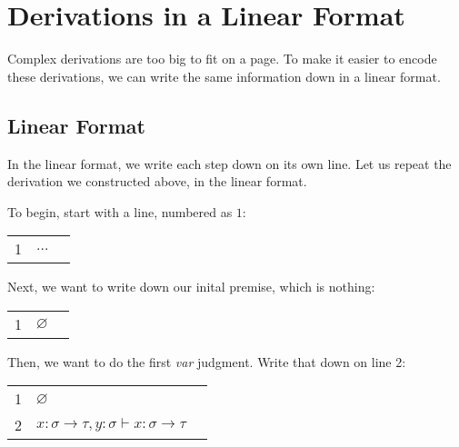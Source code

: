 \documentclass{book}
\numberwithin{equation}{chapter}
\newenvironment{typederivation}
  {\begin{tabular}[t]{l l l}}
  {\end{tabular}}
\newcommand{\tdnum}[1]{#1}
\newcommand{\tdjudge}[1]{& #1}
\newcommand{\tdjustify}[1]{& #1 \\}
\begin{document}
\chapter{Derivations in a Linear Format}

Complex derivations are too big to fit on a page. To make it easier to encode these derivations, we can write the same information down in a linear format. 


\section{Linear Format}

In the linear format, we write each step down on its own line. Let us repeat the derivation we constructed above, in the linear format.

To begin, start with a line, numbered as $1$:

\begin{center}
\begin{typederivation}

  \tdnum{1} \tdjudge{$\ldots$} \tdjustify{}

\end{typederivation}
\end{center}

\noindent
Next, we want to write down our inital premise, which is nothing:

\begin{center}
\begin{typederivation}

  \tdnum{1} \tdjudge{$\varnothing$} \tdjustify{}

\end{typederivation}
\end{center}

\noindent
Then, we want to do the first \textit{var} judgment. Write that down on line 2:

\begin{center}
\begin{typederivation}

  \tdnum{1} \tdjudge{$\varnothing$} \tdjustify{}
  \tdnum{2} \tdjudge{$x : \sigma \rightarrow \tau, y : \sigma \vdash x : \sigma \rightarrow \tau$} \tdjustify{}

\end{typederivation}
\end{center}
\end{document}
